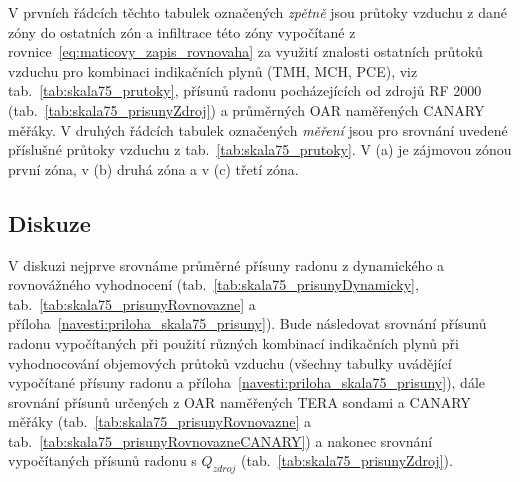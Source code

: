 \begin{table}[H]
    \centering
    \caption{V prvních řádcích těchto tabulek označených \emph{zpětně} jsou průtoky vzduchu z dané zóny do ostatních zón a infiltrace této zóny vypočítané z rovnice~\eqref{eq:maticovy_zapis_rovnovaha} za využití znalosti ostatních průtoků vzduchu pro kombinaci indikačních plynů (TMH, MCH, PCE), viz tab.~\ref{tab:skala75_prutoky}, přísunů radonu pocházejících od zdrojů RF 2000 (tab.~\ref{tab:skala75_prisunyZdroj}) a průměrných OAR naměřených CANARY měřáky. V druhých řádcích tabulek označených \emph{měření} jsou pro srovnání uvedené příslušné průtoky vzduchu z tab.~\ref{tab:skala75_prutoky}. V (a) je zájmovou zónou první zóna, v (b) druhá zóna a v (c) třetí zóna.}
    \label{tab:skala75_prutoky_zpetne}
    \begin{subtable}{\textwidth}
        \centering
        \caption{}
        
    \end{subtable}
    \vspace{1em}

    \begin{subtable}{\textwidth}
        \centering
        \caption{}
        
    \end{subtable}
    \vspace{1em}

    \begin{subtable}{\textwidth}
        \centering
        \caption{}
        
    \end{subtable}
\end{table}

\subsection{Diskuze}
V diskuzi nejprve srovnáme průměrné přísuny radonu z dynamického a rovnovážného vyhodnocení  (tab.~\ref{tab:skala75_prisunyDynamicky}, tab.~\ref{tab:skala75_prisunyRovnovazne} a příloha~\ref{navesti:priloha_skala75_prisuny}). Bude následovat srovnání přísunů radonu vypočítaných při použití různých kombinací indikačních plynů při vyhodnocování objemových průtoků vzduchu (všechny tabulky uvádějící vypočítané přísuny radonu a příloha~\ref{navesti:priloha_skala75_prisuny}), dále srovnání přísunů určených z OAR naměřených TERA sondami a CANARY měřáky (tab.~\ref{tab:skala75_prisunyRovnovazne} a tab.~\ref{tab:skala75_prisunyRovnovazneCANARY}) a nakonec srovnání vypočítaných přísunů radonu s $Q_{zdroj}$ (tab.~\ref{tab:skala75_prisunyZdroj}). 

